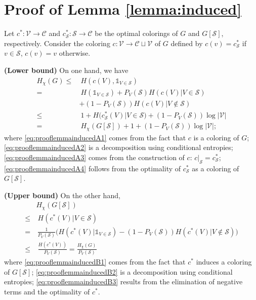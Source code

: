 \documentclass[conference,a4paper]{IEEEtran}
\begin{document}
\section{Proof of Lemma \ref{lemma:induced}}\label{section:prooflemmainduced}

Let $c^* : \mathcal{V} \rightarrow \mathcal{C}$ and $c^*_\mathcal{S} : \mathcal{S} \rightarrow \mathcal{C}$ be the optimal colorings of $G$ and $G[\mathcal{S}]$, respectively. Consider the coloring $c : \mathcal{V} \rightarrow \mathcal{C} \sqcup \mathcal{V}$ of $G$ defined by $c(v) = c^*_\mathcal{S}$ if $v \in \mathcal{S}$, $c(v) = v$ otherwise.\newline

\textbf{(Lower bound)} On one hand, we have
\begin{align}
    H_\chi(G) \leq &\: H(c(V), \mathds{1}_{V \in \mathcal{S}}) \label{eq:prooflemmainducedA1}\\
    = &\: H(\mathds{1}_{V \in \mathcal{S}}) + P_V(\mathcal{S}) H(c(V)|V \in \mathcal{S}) \nonumber\\
     &+ (1-P_V(\mathcal{S})) H(c(V)|V \notin \mathcal{S}) \label{eq:prooflemmainducedA2}\\
    \leq &\: 1 + H(c^*_\mathcal{S}(V)|V \in \mathcal{S}) + (1-P_V(\mathcal{S})) \log |\mathcal{V}| \label{eq:prooflemmainducedA3}\\
    = &\: H_\chi(G[\mathcal{S}]) + 1 + (1-P_V(\mathcal{S})) \log |\mathcal{V}|;\label{eq:prooflemmainducedA4}
\end{align}
where \eqref{eq:prooflemmainducedA1} comes from the fact that $c$ is a coloring of $G$; \eqref{eq:prooflemmainducedA2} is a decomposition using conditional entropies; \eqref{eq:prooflemmainducedA3} comes from the construction of $c$: $c|_\mathcal{S} = c^*_{\mathcal{S}}$; \eqref{eq:prooflemmainducedA4} follows from the optimality of $c^*_\mathcal{S}$ as a coloring of $G[\mathcal{S}]$.\newline

\textbf{(Upper bound)} On the other hand, 
\begin{align}
    & H_\chi(G[\mathcal{S}]) \nonumber\\
    \leq & \: H(c^*(V) | V \in \mathcal{S}) \label{eq:prooflemmainducedB1} \\
    = & \, \frac{1}{P_V(\mathcal{S})}\Big(\!H(c^*(V)| \mathds{1}_{V \in \mathcal{S}}) - (1-P_V(\mathcal{S}))H(c^*(V) | V \notin \mathcal{S})\!\Big) \label{eq:prooflemmainducedB2} \\
    \leq & \: \frac{H(c^*(V))}{P_V(\mathcal{S})} = \frac{H_\chi(G)}{P_V(\mathcal{S})} \label{eq:prooflemmainducedB3} 
\end{align}
where \eqref{eq:prooflemmainducedB1} comes from the fact that $c^*$ induces a coloring of $G[\mathcal{S}]$; \eqref{eq:prooflemmainducedB2} is a decomposition using conditional entropies; \eqref{eq:prooflemmainducedB3} results from the elimination of negative terms and the optimality of $c^*$.
\end{document}
